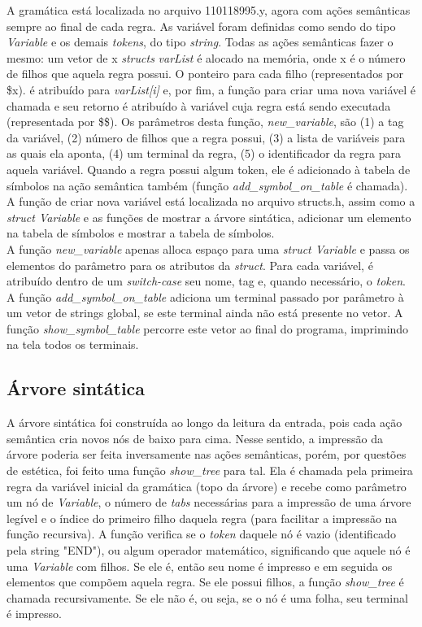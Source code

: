 \documentclass[12pt]{article}
\begin{document}
\indent A gramática está localizada no arquivo 110118995.y, agora com ações semânticas sempre ao final de cada regra. As variável foram definidas como sendo do tipo \textit{Variable} e os demais \textit{tokens}, do tipo \textit{string}. Todas as ações semânticas fazer o mesmo: um vetor de x \textit{structs} \textit{varList} é alocado na memória, onde x é o número de filhos que aquela regra possui. O ponteiro para cada filho (representados por \$x). é atribuído para \textit{varList[i] }e, por fim, a função para criar uma nova variável é chamada e seu retorno é atribuído à variável cuja regra está sendo executada (representada por \$\$). Os parâmetros desta função, \textit{new\_variable}, são (1) a tag da variável, (2) número de filhos que a regra possui, (3) a lista de variáveis para as quais ela aponta, (4) um terminal da regra, (5) o identificador da regra para aquela variável. Quando a regra possui algum token, ele é adicionado à tabela de símbolos na ação semântica também (função \textit{add\_symbol\_on\_table} é chamada). A função de criar nova variável está localizada no arquivo structs.h, assim como a \textit{struct Variable} e as funções de mostrar a árvore sintática, adicionar um elemento na tabela de símbolos e mostrar a tabela de símbolos.  \\
\indent A função \textit{new\_variable} apenas alloca espaço para uma \textit{struct Variable} e passa os elementos do parâmetro para os atributos da \textit{struct}. Para cada variável, é atribuído dentro de um \textit{switch-case} seu nome, tag e, quando necessário, o \textit{token}. A função \textit{add\_symbol\_on\_table} adiciona um terminal passado por parâmetro à um vetor de strings global, se este terminal ainda não está presente no vetor. A função \textit{show\_symbol\_table} percorre este vetor ao final do programa, imprimindo na tela todos os terminais.

\subsection{Árvore sintática}
\indent A árvore sintática foi construída ao longo da leitura da entrada, pois cada ação semântica cria novos nós de baixo para cima. Nesse sentido, a impressão da árvore poderia ser feita inversamente nas ações semânticas, porém, por questões de estética, foi feito uma função \textit{show\_tree} para tal. Ela é chamada pela primeira regra da variável inicial da gramática (topo da árvore) e recebe como parâmetro um nó de \textit{Variable}, o número de \textit{tabs} necessárias para a impressão de uma árvore legível e o índice do primeiro filho daquela regra (para facilitar a impressão na função recursiva). A função verifica se o \textit{token} daquele nó é vazio (identificado pela string "END"), ou algum operador matemático, significando que aquele nó é uma \textit{Variable} com filhos. Se ele é, então seu nome é impresso e em seguida os elementos que compõem aquela regra. Se ele possui filhos, a função \textit{show\_tree} é chamada recursivamente. Se ele não é, ou seja, se o nó é uma folha,  seu terminal é impresso.
\end{document}
